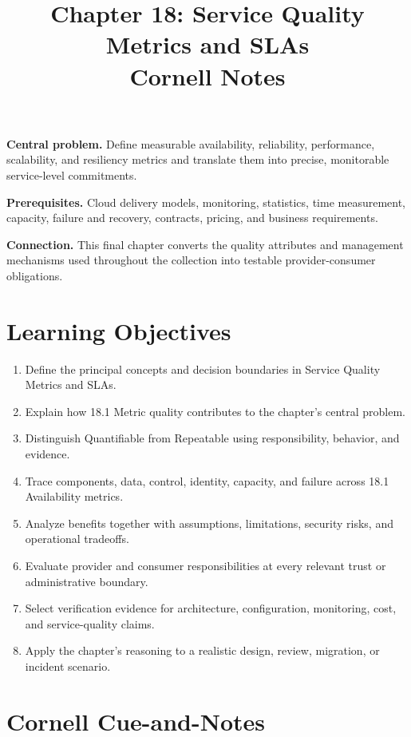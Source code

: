 \documentclass[11pt]{article}
\title{Chapter 18: Service Quality Metrics and SLAs\\[2mm]\large Cornell Notes}
\author{}
\date{}
\begin{document}
\maketitle
\thispagestyle{fancy}
\vspace{-1.5em}
\begin{orientationbox}
\textbf{Central problem.} Define measurable availability, reliability, performance, scalability, and resiliency metrics and translate them into precise, monitorable service-level commitments.\par\smallskip
\textbf{Prerequisites.} Cloud delivery models, monitoring, statistics, time measurement, capacity, failure and recovery, contracts, pricing, and business requirements.\par\smallskip
\textbf{Connection.} This final chapter converts the quality attributes and management mechanisms used throughout the collection into testable provider-consumer obligations.
\end{orientationbox}
\section{Learning Objectives}
\begin{enumerate}
\item Define the principal concepts and decision boundaries in Service Quality Metrics and SLAs.
\item Explain how 18.1 Metric quality contributes to the chapter's central problem.
\item Distinguish Quantifiable from Repeatable using responsibility, behavior, and evidence.
\item Trace components, data, control, identity, capacity, and failure across 18.1 Availability metrics.
\item Analyze benefits together with assumptions, limitations, security risks, and operational tradeoffs.
\item Evaluate provider and consumer responsibilities at every relevant trust or administrative boundary.
\item Select verification evidence for architecture, configuration, monitoring, cost, and service-quality claims.
\item Apply the chapter's reasoning to a realistic design, review, migration, or incident scenario.
\end{enumerate}
\section{Cornell Cue-and-Notes}
\end{document}
